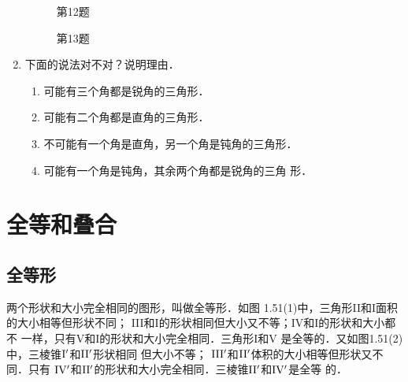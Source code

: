 \begin{enumerate}
\begin{figure}[htp]\centering
    \begin{minipage}[t]{0.48\textwidth}
    \centering
{}
    \caption*{第12题}
    \end{minipage}
    \begin{minipage}[t]{0.48\textwidth}
    \centering
    \caption*{第13题}
    \end{minipage}
    \end{figure}


\item 下面的说法对不对？说明理由．
\begin{enumerate}
\item 可能有三个角都是锐角的三角形．
\item 可能有二个角都是直角的三角形．
\item 不可能有一个角是直角，另一个角是钝角的三角形．
\item 可能有一个角是钝角，其余两个角都是锐角的三角
形．
\end{enumerate}
\end{enumerate}

\section{全等和叠合}

\subsection{全等形}
两个形状和大小完全相同的图形，叫做全等形．如图
1.51(1)中，三角形II和I面积的大小相等但形状不同；
III和I的形状相同但大小又不等；IV和I的形状和大小都不
一样，只有V和I的形状和大小完全相同．三角形I和V
是全等的．又如图1.51(2)中，三棱锥$\rm I'$和$\rm II'$形状相同
但大小不等；
$\rm III'$和$\rm II'$体积的大小相等但形状又不同．只有
$\rm IV'$和$\rm II'$的形状和大小完全相同．三棱锥$\rm II'$和$\rm IV'$是全等
的．


